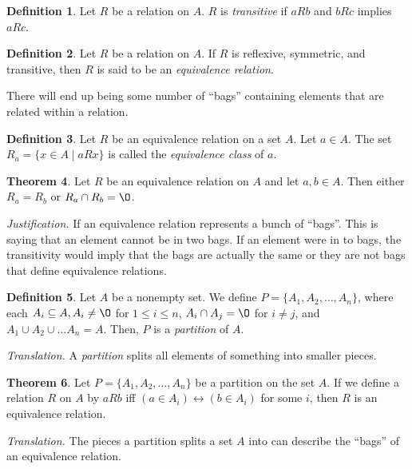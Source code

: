 \documentclass[11pt]{article}
\theoremstyle{definition}
\newtheorem{theorem}{Theorem}[section]
\newtheorem{definition}[theorem]{Definition}
\newenvironment{just}{\textit{Justification.}}{}
\newenvironment{trans}{\textit{Translation.}}{}
\begin{document}
\begin{definition}
    Let $R$ be a relation on $A$. $R$ is \emph{transitive} if $aRb$ and $bRc$ implies $aRc$.
\end{definition}
\begin{definition}
Let $R$ be a relation on $A$. If $R$ is reflexive, symmetric, and transitive, then $R$ is said to be an \emph{equivalence relation}.
\end{definition}
There will end up being some number of ``bags'' containing elements that are related within a relation.
\begin{definition}
    Let $R$ be an equivalence relation on a set $A$. Let $a\in A$. The set $R_a = \{ x \in A \mid aRx\}$ is called the \emph{equivalence class} of $a$.
\end{definition}
\begin{theorem}
Let $R$ be an equivalence relation on $A$ and let $a,b \in A$. Then either $R_a=R_b$ or $R_a \cap R_b = \O$.
\end{theorem}
\begin{just}
If an equivalence relation represents a bunch of ``bags''. This is saying that an element cannot be in two bags. If an element were in to bags, the transitivity would imply that the bags are actually the same or they are not bags that define equivalence relations.
\end{just}
\begin{definition}
    Let $A$ be a nonempty set. We define $P = \{ A_1,A_2,\dots,A_n \}$, where each $A_i \subseteq A, A_i \neq \O$ for $1 \leq i \leq n$, $A_i \cap A_j = \O$ for $i \neq j$, and $A_1 \cup A_2 \cup \dots A_n = A$. Then, $P$ is a \emph{partition} of $A$.
\end{definition}
\begin{trans}
    A \emph{partition} splits all elements of something into smaller pieces.
\end{trans}
\begin{theorem}
    Let $P = \{ A_1, A_2, \dots, A_n \}$ be a partition on the set $A$. If we define a relation $R$ on $A$ by $aRb$ iff $(a \in A_i) \leftrightarrow (b \in A_i)$ for some $i$, then $R$ is an equivalence relation. 
\end{theorem}
\begin{trans}
    The pieces a partition splits a set $A$ into can describe the ``bags'' of an equivalence relation.
\end{trans}
\end{document}
